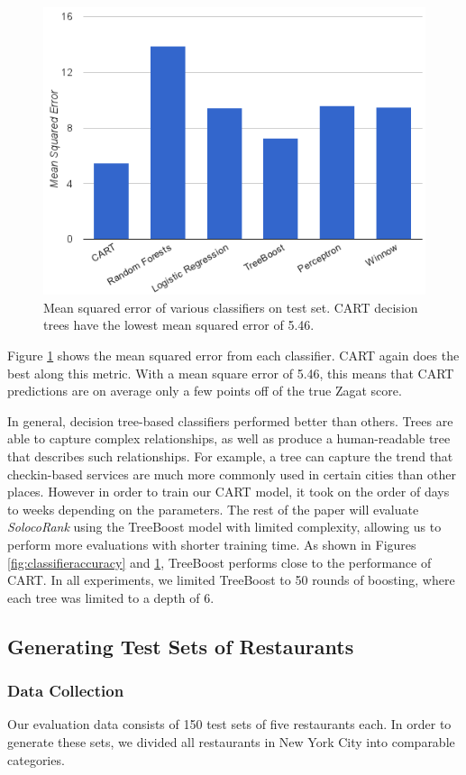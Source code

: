 \begin{figure}
  \includegraphics[width=.5\textwidth]{fig/meansqerror.png}
  \caption{Mean squared error of various classifiers on test set.
  CART decision trees have the lowest mean squared error of 5.46.}
  \label{fig:classifiermeansqerror}
\end{figure}

Figure \ref{fig:classifiermeansqerror} shows the mean squared error from each classifier.
CART again does the best along this metric.
With a mean square error of 5.46, this means that CART predictions are on average only a
few points off of the true Zagat score.

In general, decision tree-based classifiers performed better than others.
Trees are able to capture complex relationships, as well as produce a human-readable
tree that describes such relationships.
For example, a tree can capture the trend that checkin-based services 
are much more commonly used in certain cities than other places.
However in order to train our CART model, it took on the order of days to weeks depending
on the parameters.
The rest of the paper will evaluate \emph{SolocoRank} using the TreeBoost model with limited
complexity, allowing us to perform more evaluations with shorter training time.
As shown in Figures \ref{fig:classifieraccuracy} and \ref{fig:classifiermeansqerror},
TreeBoost performs close to the performance of CART.
In all experiments, we limited TreeBoost to 50 rounds of boosting,
where each tree was limited to a depth of 6.

\subsection{Generating Test Sets of Restaurants}
\subsubsection{Data Collection}
Our evaluation data consists of 150 test sets of five restaurants each.
In order to generate these sets, we divided all restaurants in New York City into comparable categories.

